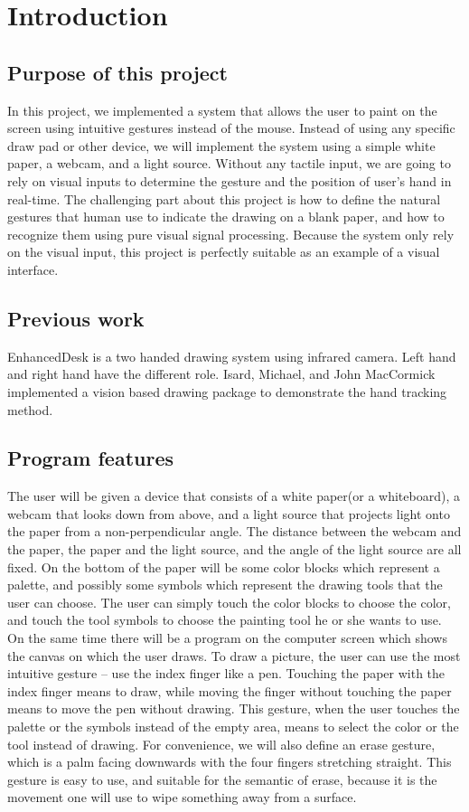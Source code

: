 \section{Introduction}
\subsection{Purpose of this project}
    In this project, we implemented a system that allows the user to paint on the screen using intuitive gestures instead of the mouse. 
    Instead of using any specific draw pad or other device, we will implement the system using a simple white paper, a webcam, and a light source. 
    Without any tactile input, we are going to rely on visual inputs to determine the gesture and the position of user's hand in real-time. 
    The challenging part about this project is how to define the natural gestures that human use to indicate the drawing on a  blank paper, and how to recognize them using pure visual signal processing. Because the system only rely on the visual input, this project is perfectly suitable as an example of a visual interface. 
\subsection{Previous work}
    EnhancedDesk\cite{a} is a two handed drawing system using infrared camera. Left hand and right hand have the different role.  Isard, Michael, and John MacCormick implemented a vision based drawing package to demonstrate the hand tracking method\cite{b}.
\subsection{Program features}
The user will be given a device that consists of a white paper(or a whiteboard), a webcam that looks down from above, 
and a light source that projects light onto the paper from a non-perpendicular angle.
The distance between the webcam and the paper, the paper and the light source, and the angle of the light source are all fixed. On the bottom of the paper will be some color blocks which represent a palette, and possibly some symbols which represent the drawing tools that the user can choose. The user can simply touch the color blocks to choose the color, and touch the tool symbols to choose the painting tool he or she wants to use. On the same time there will be a program on the computer screen which shows the canvas on which the user draws. 
To draw a picture, the user can use the most intuitive gesture -- use the index finger like a pen. 
Touching the paper with the index finger means to draw, while moving the finger without touching the paper means to move the pen without drawing. 
This gesture, when the user touches the palette or the symbols instead of the empty area, means to select the color or the tool instead of drawing. 
For convenience, we will also define an erase gesture, which is a palm facing downwards with the four fingers stretching straight. This gesture is easy to use, and suitable for the semantic of erase, because it is the movement one will use to wipe something away from a surface.
